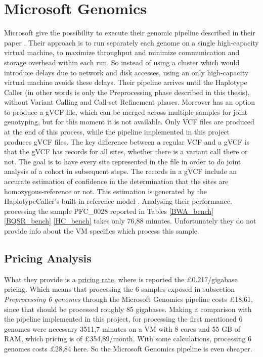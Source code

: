 \section{Microsoft Genomics}
Microsoft give the possibility to execute their genomic pipeline described in their paper \cite{MicrosoftGenomics}. Their approach is to run separately each genome on a single high-capacity virtual machine, to maximize throughput and minimize communication and storage overhead within each run. So instead of using a cluster which would introduce delays due to network and disk accesses, using an only high-capacity virtual machine avoids these delays. Their pipeline arrives until the Haplotype Caller (in other words is only the Preprocessing phase described in this thesis), without Variant Calling and Call-set Refinement phases. Moreover has an option to produce a gVCF file, which can be merged across multiple samples for joint genotyping, but for this moment it is not available. Only VCF files are produced at the end of this process, while the pipeline implemented in this project produces gVCF files.\newline
The key difference between a regular VCF and a gVCF is that the gVCF has records for all sites, whether there is a variant call there or not. The goal is to have every site represented in the file in order to do joint analysis of a cohort in subsequent steps. The records in a gVCF include an accurate estimation of confidence in the determination that the sites are homozygous-reference or not. This estimation is generated by the HaplotypeCaller's built-in reference model \cite{gVCF}.\newline
Analysing their performance, processing the sample PFC\_0028 reported in Tables \ref{BWA_bench} \ref{BQSR_bench} \ref{HC_bench} takes only 76,88 minutes. Unfortunately they do not provide info about the VM specifics which process this sample. 
\subsection{Pricing Analysis}
What they provide is a \href{https://azure.microsoft.com/en-en/pricing/details/genomics/}{pricing rate}, where is reported the \pounds 0.217/gigabase pricing. Which means that processing the 6 samples exposed in subsection \textit{Preprocessing 6 genomes} through the Microsoft Genomics pipeline costs \pounds 18.61, since that should be processed roughly 85 gigabases. Making a comparison with the pipeline implemented in this project, for processing the first mentioned 6 genomes were necessary 3511,7 minutes on a VM with 8 cores and 55 GB of RAM, which pricing is of \pounds 354,89/month. With some calculations, processing 6 genomes costs \pounds28,84 here. So the Microsoft Genomics pipeline is even cheaper.

